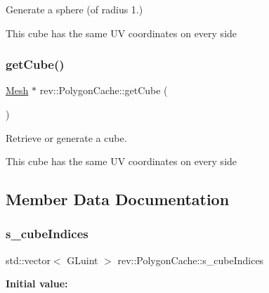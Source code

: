 Generate a sphere (of radius 1.) 

This cube has the same UV coordinates on every side \mbox{\label{classrev_1_1_polygon_cache_abe26e97c86b30322ecd6745cec726e4d}} 
\subsubsection{\texorpdfstring{getCube()}{getCube()}}
{\footnotesize\ttfamily \mbox{\hyperlink{classrev_1_1_mesh}{Mesh}} $\ast$ rev\+::\+Polygon\+Cache\+::get\+Cube (\begin{DoxyParamCaption}{ }\end{DoxyParamCaption})}



Retrieve or generate a cube. 

This cube has the same UV coordinates on every side 

\subsection{Member Data Documentation}
\mbox{\label{classrev_1_1_polygon_cache_a08172cb0065024482d30c724e071292c}} 
\subsubsection{\texorpdfstring{s\_cubeIndices}{s\_cubeIndices}}
{\footnotesize\ttfamily std\+::vector$<$ G\+Luint $>$ rev\+::\+Polygon\+Cache\+::s\+\_\+cube\+Indices\hspace{0.3cm}{\ttfamily [static]}}

{\bfseries Initial value\+:}
\begin{DoxyCode}{0}
\DoxyCodeLine{= \{}
\DoxyCodeLine{\}}

\end{DoxyCode}


